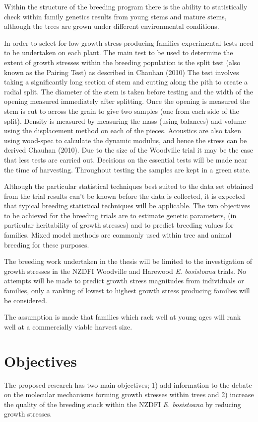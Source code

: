 \documentclass{article}
\begin{document}
Within the structure of the breeding program there is the ability to
statistically check within family genetics results from young stems and mature
stems, although the trees are grown under different environmental conditions.

In order to select for low growth stress producing families experimental tests
need to be undertaken on each plant. The main test to be used to determine the
extent of growth stresses within the breeding population is the split test (also
known as the Pairing Test) as described in Chauhan (2010) The test involves
taking a significantly long section of stem and cutting along the pith to create
a radial split. The diameter of the stem is taken before testing and the width
of the opening measured immediately after splitting. Once the opening is
measured the stem is cut to across the grain to give two samples (one from each
side of the split). Density is measured by measuring the mass (using balances)
and volume using the displacement method on each of the pieces. Acoustics are
also taken using wood-spec to calculate the dynamic modulus, and hence the
stress can be derived Chauhan (2010). Due to the size of the Woodville trial it
may be the case that less tests are carried out. Decisions on the essential
tests will be made near the time of harvesting. Throughout testing the samples
are kept in a green state.

Although the particular statistical techniques best suited to the data set
obtained from the trial results can’t be known before the data is collected, it
is expected that typical breeding statistical techniques will be applicable. The
two objectives to be achieved for the breeding trials are to estimate genetic
parameters, (in particular heritability of growth stresses) and to predict
breeding values for families. Mixed model methods are commonly used within tree
and animal breeding for these purposes.

The breeding work undertaken in the thesis will be limited to the investigation
of growth stresses in the NZDFI Woodville and Harewood \textit{E. bosistoana}
trials. No attempts will be made to predict growth stress magnitudes from
individuals or families, only a ranking of lowest to highest growth stress
producing families will be considered.

The assumption is made that families which rack well at young ages will rank
well at a commercially viable harvest size.

\section{Objectives}
The proposed research has two main objectives; 1) add information to the
debate on the molecular mechanisms forming growth stresses within trees and 2)
increase the quality of the breeding stock within the NZDFI \textit{E.
bosistoana} by reducing growth stresses.
\end{document}
